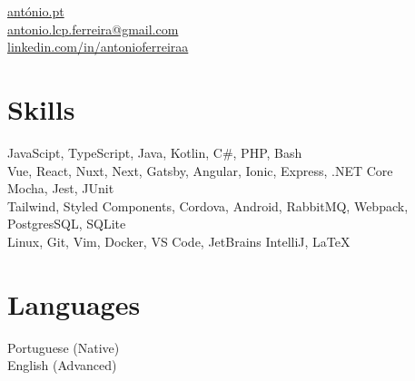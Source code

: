 \documentclass[]{hieudo-build}
\begin{document}
%
%
{
	\faHome \space \href{http://www.antónio.pt}{antónio.pt 
	}\\
	\faEnvelope \space \href{mailto:antonio.lcp.ferreira@gmail.com}{antonio.lcp.ferreira@gmail.com}\\
	\faLinkedinSquare \space \href{https://www.linkedin.com/in/antonioferreiraa}{linkedin.com/in/antonioferreiraa}
}
    
%
%
\begin{minipage}[t]{0.25\textwidth} 



\section{Skills}
JavaScipt, TypeScript, Java, Kotlin, C\#, PHP, Bash\\ 
\sectionsep
{}
Vue, React, Nuxt, Next, Gatsby, Angular, Ionic, Express, .NET Core\\
\sectionsep
{}
Mocha, Jest, JUnit \\
\sectionsep
{}
Tailwind, Styled Components, Cordova, Android, RabbitMQ, Webpack, PostgresSQL, SQLite \\
\sectionsep
{}
Linux, Git, Vim, Docker, VS Code, JetBrains IntelliJ,  {\selectfont\LaTeX} \\

\sectionsep

\section{Languages}
Portuguese (Native) \\
English (Advanced)
\sectionsep


\sectionsep

%
%
\end{minipage} 
\end{document}

